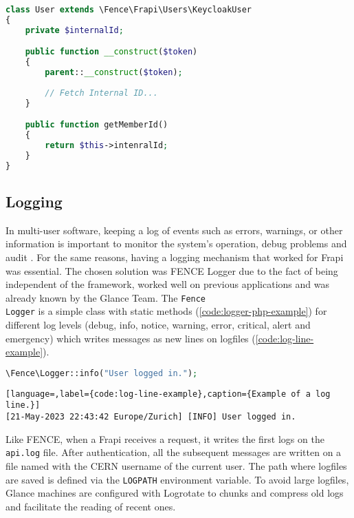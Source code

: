 \begin{lstlisting}[language=PHP,label={code:user-endpoint-response},caption={Custom \texttt{User} class with additional properties.}]
class User extends \Fence\Frapi\Users\KeycloakUser
{
	private $internalId;

	public function __construct($token)
	{
		parent::__construct($token);
		
		// Fetch Internal ID...
	}

    public function getMemberId()
    {
        return $this->intenralId;
    }
}
\end{lstlisting}


\subsection{Logging}

In multi-user software, keeping a log of events such as errors, warnings, or other information is important to monitor the system's operation, debug problems and audit \cite{logging-wikipedia}. For the same reasons, having a logging mechanism that worked for Frapi was essential. The chosen solution was FENCE Logger due to the fact of being independent of the framework, worked well on previous applications and was already known by the Glance Team. The \texttt{Fence\\Logger} is a simple class with static methods (\autoref{code:logger-php-example}) for different log levels (debug, info, notice, warning, error, critical, alert and emergency) which writes messages as new lines on logfiles (\autoref{code:log-line-example}).

\begin{lstlisting}[language=PHP,label={code:logger-php-example},caption={How to write logs on Frapi v1.}]
\Fence\Logger::info("User logged in.");
\end{lstlisting}

\begin{lstlisting}[language=,label={code:log-line-example},caption={Example of a log line.}]
[21-May-2023 22:43:42 Europe/Zurich] [INFO] User logged in.
\end{lstlisting}

Like FENCE, when a Frapi receives a request, it writes the first logs on the \texttt{api.log} file. After authentication, all the subsequent messages are written on a file named with the CERN username of the current user. The path where logfiles are saved is defined via the \texttt{LOG\textunderscore PATH} environment variable. To avoid large logfiles, Glance machines are configured with Logrotate \cite{logrotate-man} to chunks and compress old logs and facilitate the reading of recent ones.

